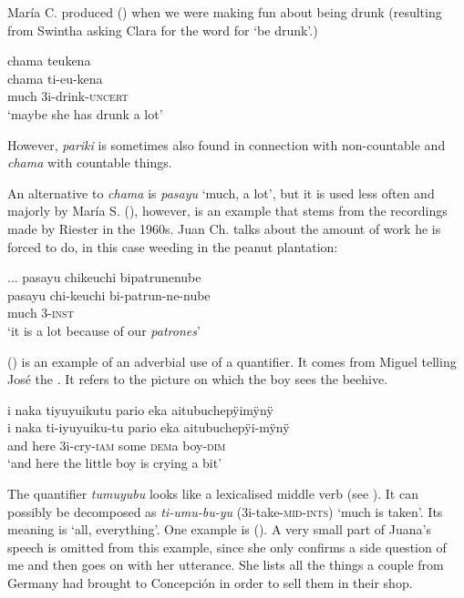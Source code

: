 María C. produced () when we were making fun about being drunk (resulting from Swintha asking Clara for the word for ‘be drunk’.)

\ea\label{ex:chama-verb}
\begingl
\glpreamble chama teukena\\
\gla chama ti-eu-kena\\
\glb much 3i-drink-\textsc{uncert}\\
\glft ‘maybe she has drunk a lot’
\endgl
\trailingcitation{[cux-c120414ls-1.056]}
\xe

However, \textit{pariki} is sometimes also found in connection with non-countable and \textit{chama} with countable things.

An alternative to \textit{chama} is \textit{pasayu} ‘much, a lot’, but it is used less often and majorly by María S. (), however, is an example that stems from the recordings made by Riester in the 1960s. Juan Ch. talks about the amount of work he is forced to do, in this case weeding in the peanut plantation:

\ea\label{ex:pasayu-n}
\begingl
\glpreamble ... pasayu chikeuchi bipatrunenube\\
\gla pasayu chi-keuchi bi-patrun-ne-nube\\
\glb much 3-\textsc{inst}\\
\glft ‘it is a lot because of our \textit{patrones}’
\endgl
\trailingcitation{[nxx-p630101g-2.26]}
\xe


() is an example of an adverbial use of a quantifier. It comes from Miguel telling José the . It refers to the picture on which the boy sees the beehive.

\ea\label{ex:pario-verb}
\begingl
\glpreamble i naka tiyuyuikutu pario eka aitubuchepÿimÿnÿ\\
\gla i naka ti-iyuyuiku-tu pario eka aitubuchepÿi-mÿnÿ\\
\glb and here 3i-cry-\textsc{iam} some \textsc{dem}a boy-\textsc{dim}\\
\glft ‘and here the little boy is crying a bit’
\endgl
\trailingcitation{[mox-a110920l-2.067]}
\xe


The quantifier \textit{tumuyubu} looks like a lexicalised middle verb (see ). It can possibly be decomposed as \textit{ti-umu-bu-yu} (3i-take-\textsc{mid}-\textsc{ints}) ‘much is taken’. Its meaning is ‘all, everything’. One example is (). A very small part of Juana’s speech is omitted from this example, since she only confirms a side question of me and then goes on with her utterance. She lists all the things a couple from Germany had brought to Concepción in order to sell them in their shop.

